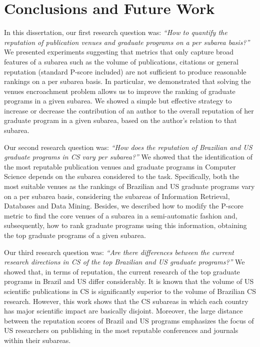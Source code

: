 \documentclass[msc]{ppgccufmg}
\begin{document}
\chapter{Conclusions and Future Work}\label{sec:conclusions}

In this dissertation, our first research question was: \textit{``How to quantify the reputation of publication venues and graduate programs on a per subarea basis?''} We presented experiments suggesting that metrics that only capture broad features of a subarea such as the volume of publications, citations or general reputation (standard P-score included) are not sufficient to produce reasonable rankings on a per subarea basis. In particular, we demonstrated that solving the venues encroachment problem allows us to improve the ranking of graduate programs in a given subarea. We showed a simple but effective strategy to increase or decrease the contribution of an author to the overall reputation of her graduate program in a given subarea, based on the author's relation to that subarea. 

Our second research question was: \textit{``How does the reputation of Brazilian and US graduate programs in CS vary per subarea?''} We showed that the identification of the most reputable publication venues and graduate programs in Computer Science depends on the subarea considered to the task. Specifically, both the most suitable venues as the rankings of Brazilian and US graduate programs vary on a per subarea basis, considering the subareas of Information Retrieval, Databases and Data Mining. Besides, we described how to modify the P-score metric to find the core venues of a subarea in a semi-automatic fashion and, subsequently, how to rank graduate programs using this information, obtaining the top graduate programs of a given subarea.

Our third research question was: \textit{``Are there differences between the current research directions in CS of the top Brazilian and US graduate programs?''} We showed that, in terms of reputation, the current research of the top graduate programs in Brazil and US differ considerably. It is known that the volume of US scientific publications in CS is significantly superior to the volume of Brazilian CS research. However, this work shows that the CS subareas in which each country has major scientific impact are basically disjoint. 
Moreover, the large distance between the reputation scores of Brazil and US programs emphasizes the focus of US researchers on publishing in the most reputable conferences and journals within their subareas. 
\end{document}

